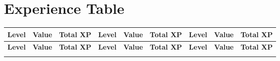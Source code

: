 \section{Experience Table}\label{sec:app-tab-xp}

\label{tab:app-xp}
\begin{longtable}[c]{ccc|ccc|ccc}
    \toprule%
    \textbf{Level} & \textbf{Value} & \textbf{Total XP} & \textbf{Level} & \textbf{Value} & \textbf{Total XP} & \textbf{Level} & \textbf{Value} & \textbf{Total XP} \\
    \midrule%
  \endhead%
    \toprule%
    \textbf{Level} & \textbf{Value} & \textbf{Total XP} & \textbf{Level} & \textbf{Value} & \textbf{Total XP} & \textbf{Level} & \textbf{Value} & \textbf{Total XP} \\
    \midrule%
  \endfirsthead%
    \bottomrule%
  \endfoot%
    \bottomrule%
  \endlastfoot%
    
\end{longtable}